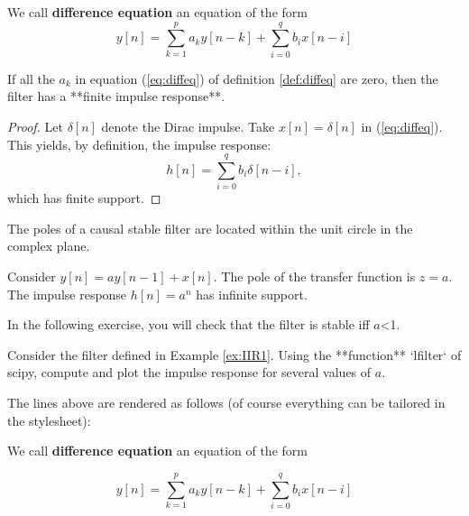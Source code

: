     \begin{listing}
\begin{definition} \label{def:diffeq}
We call \textbf{difference equation} an equation of the form
$$
\label{eq:diffeq}
y[n]= \sum_{k=1}^{p} a_k y[n-k] + \sum_{i=0}^q b_i x[n-i]
$$
\end{definition}

\begin{property}
If all the $a_k$ in equation (\ref{eq:diffeq}) of definition \ref{def:diffeq} are zero, then the filter has a **finite impulse response**. 
\end{property}

\begin{proof}
Let $\delta[n]$ denote the Dirac impulse. Take $x[n]=\delta[n]$ in (\ref{eq:diffeq}). This yields, by definition, the impulse response:
$$
\label{eq:fir}
h[n]= \sum_{i=0}^q b_i \delta[n-i],
$$
which has finite support. 
\end{proof}

\begin{theorem}
The poles of a causal stable filter are located within the unit circle in the complex plane.
\end{theorem}

\begin{example} \label{ex:IIR1}
Consider $y[n]= a y[n-1] +  x[n]$. The pole of the transfer function is $z=a$. The impulse response $h[n]=a^n$ has infinite support.
\end{example}

In the following exercise, you will check that the filter is stable iff $a$<1.

\begin{exercise}\label{ex:exofilter}
Consider the filter defined in Example \ref{ex:IIR1}. Using the **function** `lfilter` of scipy, compute and plot the impulse response for several values of $a$.
\end{exercise}

\end{listing}

    The lines above are rendered as follows (of course everything can be
tailored in the stylesheet):

\begin{definition}
\label{def:diffeq} We call \textbf{difference equation} an equation of
the form

\begin{equation}
\label{eq:diffeq}
y[n]= \sum_{k=1}^{p} a_k y[n-k] + \sum_{i=0}^q b_i x[n-i]
\end{equation}
\end{definition}

